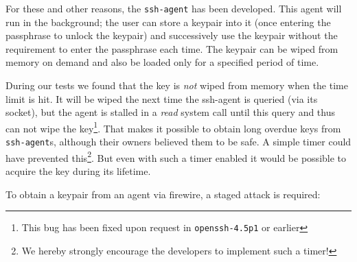 For these and other reasons, the \texttt{ssh-agent} has been developed. This
agent will run in the background; the user can store a keypair into it (once
entering the passphrase to unlock the keypair) and successively use the keypair
without the requirement to enter the passphrase each time. The keypair can be
wiped from memory on demand and also be loaded only for a specified period of
time.

During our tests we found that the key is \emph{not} wiped from memory when the
time limit is hit. It will be wiped the next time the ssh-agent is queried (via
its socket), but the agent is stalled in a \emph{read} system call until this
query and thus can not wipe the key\footnote{This bug has been fixed upon
request in \texttt{openssh-4.5p1} or earlier}.  That makes it possible to obtain
long overdue keys from \texttt{ssh-agent}s, although their owners believed them
to be safe. A simple timer could have prevented this\footnote{We hereby strongly
encourage the developers to implement such a timer!}. But even with such a timer
enabled it would be possible to acquire the key during its lifetime.

To obtain a keypair from an agent via firewire, a staged attack is required:



